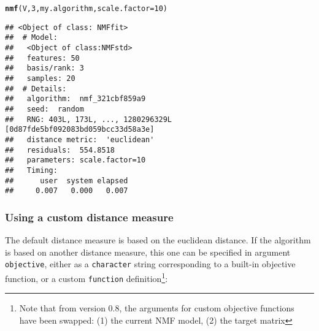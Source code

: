 \documentclass[a4paper]{article}\usepackage[]{graphicx}\usepackage[]{color}
\makeatletter
\newcommand{\hlnum}[1]{\textcolor[rgb]{0.686,0.059,0.569}{#1}}%
\newcommand{\hlstd}[1]{\textcolor[rgb]{0.345,0.345,0.345}{#1}}%
\newcommand{\hlkwc}[1]{\textcolor[rgb]{0.333,0.667,0.333}{#1}}%
\newcommand{\hlkwd}[1]{\textcolor[rgb]{0.737,0.353,0.396}{\textbf{#1}}}%
\newenvironment{kframe}{%
 \def\at@end@of@kframe{}%
 \ifinner\ifhmode%
  \def\at@end@of@kframe{\end{minipage}}%
  \begin{minipage}{\columnwidth}%
 \fi\fi%
 \def\FrameCommand##1{\hskip\@totalleftmargin \hskip-\fboxsep
 \colorbox{shadecolor}{##1}\hskip-\fboxsep
     \hskip-\linewidth \hskip-\@totalleftmargin \hskip\columnwidth}%
 \MakeFramed {\advance\hsize-\width
   \@totalleftmargin\z@ \linewidth\hsize
   \@setminipage}}%
 {\par\unskip\endMakeFramed%
 \at@end@of@kframe}
\newenvironment{knitrout}{}{} %
\let\code=\texttt
\makeatother
\begin{document}
\begin{knitrout}
\color{fgcolor}\begin{kframe}
\begin{alltt}
\hlkwd{nmf}\hlstd{(V,} \hlnum{3}\hlstd{, my.algorithm,} \hlkwc{scale.factor}\hlstd{=}\hlnum{10}\hlstd{)}
\end{alltt}
\begin{verbatim}
## <Object of class: NMFfit>
##  # Model:
##   <Object of class:NMFstd>
##   features: 50 
##   basis/rank: 3 
##   samples: 20 
##  # Details:
##   algorithm:  nmf_321cbf859a9 
##   seed:  random 
##   RNG: 403L, 173L, ..., 1280296329L [0d87fde5bf092083bd059bcc33d58a3e]
##   distance metric:  'euclidean' 
##   residuals:  554.8518 
##   parameters: scale.factor=10 
##   Timing:
##      user  system elapsed 
##     0.007   0.000   0.007
\end{verbatim}
\end{kframe}
\end{knitrout}

\subsubsection{Using a custom distance measure}
The default distance measure is based on the euclidean distance. 
If the algorithm is based on another distance measure, this one can be specified in argument \code{objective}, either as a \code{character} string corresponding to a built-in objective function, or a custom \code{function} definition\footnote{Note that from version 0.8, the arguments for custom objective functions have been swapped: (1) the current NMF model, (2) the target matrix}:
\end{document}
